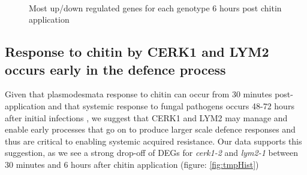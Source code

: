 \documentclass[../main.tex]{subfiles}
\begin{document}
\begin{figure}[!ht]
  \centering
  \\
  \caption{Most up/down regulated genes for each genotype 6 hours post chitin application}
  \label{fig:DEG6}
\end{figure}



\subsection{Response to chitin by CERK1 and LYM2 occurs early in the defence
  process}
\label{sec:resp-chit-cerk1}

Given that plasmodesmata response to chitin can occur from 30 minutes
post-application \cite{chevalChitinPerceptionPlasmodesmata2019} and that
systemic response to fungal pathogens occurs 48-72 hours after initial
infections \cite{gaoSignalRegulatorsSystemic2015}, we suggest that CERK1 and
LYM2 may manage and enable early processes that go on to produce larger scale
defence responses and thus are critical to enabling systemic acquired
resistance. Our data supports this suggestion, as we see a strong drop-off of
DEGs for \textit{cerk1-2} and \textit{lym2-1} between 30 minutes and 6 hours
after chitin application (figure: \ref{fig:tmpHist})
\end{document}

